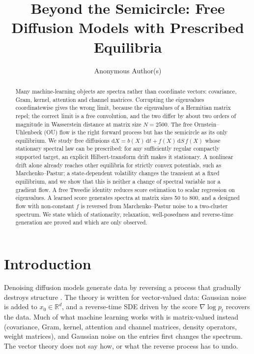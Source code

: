 \documentclass[11pt]{article}
\newcommand{\R}{\mathbb{R}}
\theoremstyle{plain}
\theoremstyle{definition}
\theoremstyle{remark}
\begin{document}
\sloppy

\title{Beyond the Semicircle: Free Diffusion Models with Prescribed Equilibria}
\author{Anonymous Author(s)}
\date{}
\maketitle

\begin{abstract}
Many machine-learning objects are spectra rather than coordinate vectors: covariance, Gram,
kernel, attention and channel matrices. Corrupting the eigenvalues coordinatewise gives the
wrong limit, because the eigenvalues of a Hermitian matrix repel; the correct limit is a free
convolution, and the two differ by about two orders of magnitude in Wasserstein distance at
matrix size $N=2500$. The free Ornstein--Uhlenbeck (OU) flow is the right forward process
but has the semicircle as its only equilibrium. We study free diffusions
$\mathrm dX=b(X)\,\mathrm dt+f(X)\,\mathrm dS\,f(X)$ whose stationary spectral law can be
prescribed: for any sufficiently regular compactly supported target, an explicit
Hilbert-transform drift makes it stationary. A nonlinear drift alone already reaches other
equilibria for strictly convex potentials, such as Marchenko--Pastur; a state-dependent
volatility changes the transient at a fixed equilibrium, and we show that this is neither a
change of spectral variable nor a gradient flow. A free Tweedie identity reduces score
estimation to scalar regression on eigenvalues. A learned score generates spectra at matrix
sizes 50 to 800, and a designed flow with non-constant $f$ is reversed from Marchenko--Pastur
noise to a two-cluster spectrum. We state which of stationarity, relaxation, well-posedness
and reverse-time generation are proved and which are only observed.
\end{abstract}

\section{Introduction}\label{sec:intro}

Denoising diffusion models generate data by reversing a process that gradually destroys
structure \citep{SohlDickstein2015, Ho2020, Song2021}. The theory is written for vector-valued
data: Gaussian noise is added to $x_0\in\R^d$, and a reverse-time SDE driven by the score
$\nabla\log p_t$ recovers the data. Much of what machine learning works with is matrix-valued
instead (covariance, Gram, kernel, attention and channel matrices, density operators, weight
matrices), and Gaussian noise on the entries first changes the spectrum. The vector theory does
not say how, or what the reverse process has to undo.
\end{document}
